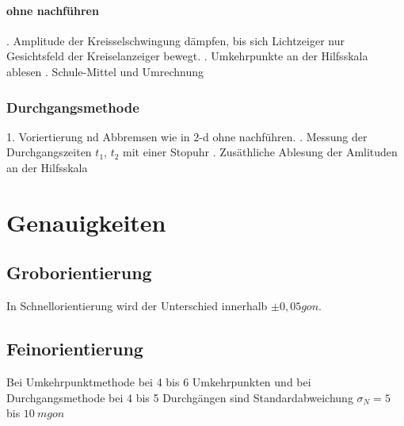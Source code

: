\documentclass[12pt]{article}
\begin{document}
\paragraph{ohne nachführen}
. Amplitude der Kreisselschwingung dämpfen, bis sich Lichtzeiger nur Gesichtsfeld der Kreiselanzeiger bewegt. . Umkehrpunkte an der Hilfsskala ablesen . Schule-Mittel und Umrechnung
\subsubsection{Durchgangsmethode}
\begin{figure}[ht]\centering
\end{figure}
1. Voriertierung nd Abbremsen wie in 2-d ohne nachführen. . Messung der Durchgangszeiten $t_1$, $t_2$ mit einer Stopuhr . Zusäthliche Ablesung der Amlituden an der Hilfsskala \newline
\section{Genauigkeiten}
\subsection{Groborientierung}
In Schnellorientierung wird der Unterschied innerhalb $\pm 0,05gon$.
\subsection{Feinorientierung}
Bei Umkehrpunktmethode bei 4 bis 6 Umkehrpunkten und bei Durchgangsmethode bei 4 bis 5 Durchgängen sind Standardabweichung $\sigma_N = 5$ bis $10\ mgon$
\end{document}
